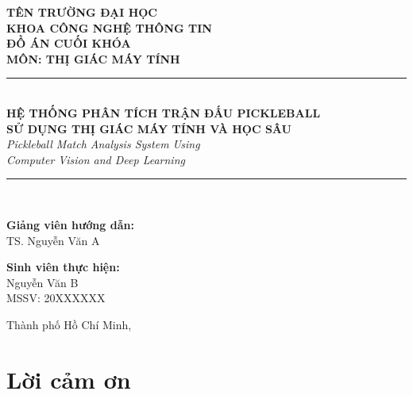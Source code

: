 \documentclass[12pt,a4paper]{article}
\begin{document}
\begin{titlepage}
\centering
\vspace*{1cm}


{\large\textbf{TÊN TRƯỜNG ĐẠI HỌC}}\\[0.3cm]
{\large\textbf{KHOA CÔNG NGHỆ THÔNG TIN}}\\[2cm]

{\Huge\textbf{ĐỒ ÁN CUỐI KHÓA}}\\[0.5cm]
{\Large\textbf{MÔN: THỊ GIÁC MÁY TÍNH}}\\[2cm]

\rule{\textwidth}{1.5pt}\\[0.5cm]
{\LARGE\textbf{HỆ THỐNG PHÂN TÍCH TRẬN ĐẤU PICKLEBALL\\SỬ DỤNG THỊ GIÁC MÁY TÍNH VÀ HỌC SÂU}}\\[0.3cm]
{\large\textit{Pickleball Match Analysis System Using\\Computer Vision and Deep Learning}}\\[0.3cm]
\rule{\textwidth}{1.5pt}\\[2.5cm]

\begin{minipage}{0.45\textwidth}
\begin{flushleft}
\textbf{Giảng viên hướng dẫn:}\\
TS. Nguyễn Văn A
\end{flushleft}
\end{minipage}
\hfill
\begin{minipage}{0.45\textwidth}
\begin{flushright}
\textbf{Sinh viên thực hiện:}\\
Nguyễn Văn B\\
MSSV: 20XXXXXX
\end{flushright}
\end{minipage}

\vfill
{\large Thành phố Hồ Chí Minh, \the\year}
\end{titlepage}

\newpage
\section*{Lời cảm ơn}
\end{document}
